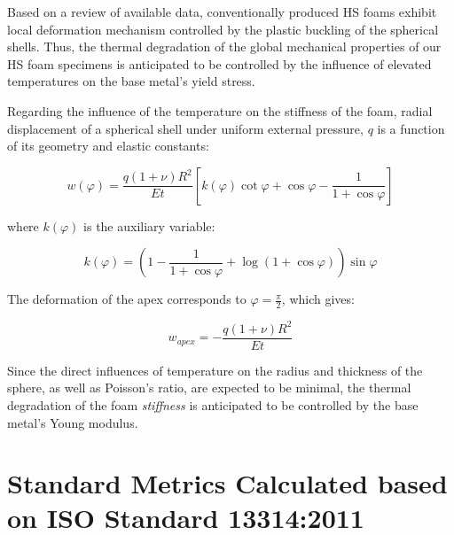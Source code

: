 \documentclass[review]{elsarticle}
\begin{document}
{



Based on a review of available data, conventionally produced HS foams exhibit local deformation mechanism controlled by the plastic buckling of the spherical shells. Thus, the thermal degradation of the global mechanical properties of our HS foam specimens is anticipated to be controlled by the influence of elevated temperatures on the base metal’s yield stress.

Regarding the influence of the temperature on the stiffness of the foam, radial displacement of a spherical shell under uniform external pressure, $q$ is a function of its geometry and elastic constants:

\begin{equation}\label{Eq6}
w(\varphi)=\frac{q(1+\nu)R^2}{Et}\left [ k(\varphi)\cot\varphi+\cos \varphi- \frac{1}{1+\cos\varphi} \right ]
\end{equation}


where $k(\varphi)$ is the auxiliary variable:

\begin{equation}\label{Eq7}
k(\varphi)=\left ( 1- \frac{1}{1+\cos\varphi} + \log(1+\cos\varphi) \right ) \sin \varphi
\end{equation}

The deformation of the apex corresponds to $\varphi=\frac{\pi}{2}$, which gives:

\begin{equation}\label{Eq8}
w_{apex}=-\frac{q(1+\nu)R^2}{Et}
\end{equation}

Since the direct influences of temperature on the radius and thickness of the sphere, as well as Poisson’s ratio, are expected to be minimal, the thermal degradation of the foam \emph{stiffness} is anticipated to be controlled by the base metal’s Young modulus.

\section{Standard Metrics Calculated based on ISO Standard 13314:2011}

}
\end{document}
